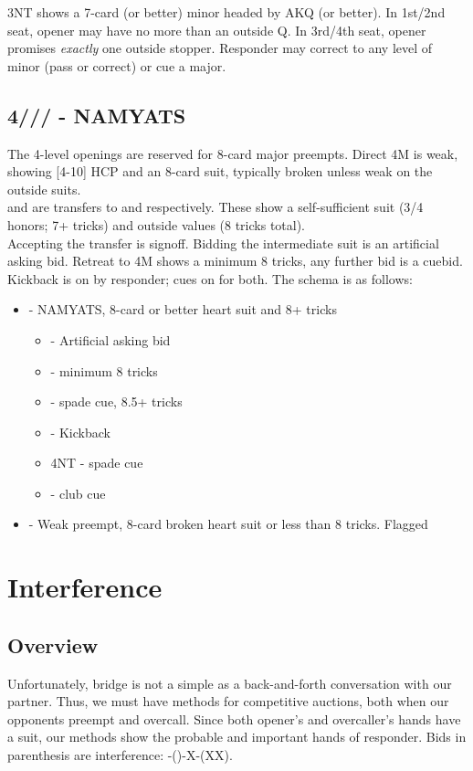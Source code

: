 \documentclass[12pt]{report}
\newcommand{\n}{\\}
\newcommand{\q}[1]{\multido{}{#1}{\qquad}}
\newcommand{\ul}[1]{\begin{itemize}#1\end{itemize}}
\newcommand{\li}[1]{\item[~] \q{#1}}
\newcommand{\bidsection}[2]{\section{\texorpdfstring{#1}{#2}}}
\begin{document}
    3NT shows a 7-card (or better) minor headed by AKQ (or better).  In 1st/2nd seat, opener may have no more than an outside Q.  In 3rd/4th seat, opener promises \textit{exactly} one outside stopper. Responder may correct to any level of minor (pass or correct) or cue a major.

\bidsection{4\cl{}/\di{}/\he{}/\sp{} - NAMYATS}{4♣/♢/♡/♠ - NAMYATS} \label{2:13}

    The 4-level openings are reserved for 8-card major preempts.  Direct 4M is weak, showing [4-10] HCP and an 8-card suit, typically broken unless weak on the outside suits.\n

     and  are transfers to  and  respectively.  These show a self-sufficient suit (3/4 honors; 7+ tricks) and outside values (8 tricks total).\n

    Accepting the transfer is signoff.  Bidding the intermediate suit is an artificial asking bid.  Retreat to 4M shows a minimum 8 tricks, any further bid is a cuebid.\n

    Kickback is on by responder; cues on for both.  The schema is as follows:

    \ul{
        \li0  - NAMYATS, 8-card or better heart suit and 8+ tricks \ul{
            \li0 \di4 - Artificial asking bid
                \li1 \he4 - minimum 8 tricks
                \li1 \sp4 - spade cue, 8.5+ tricks
            \li0 \sp4 - Kickback
            \li0 4NT - spade cue
            \li0 \cl5 - club cue
        }

        \li0 \he4 - Weak preempt, 8-card broken heart suit or less than 8 tricks.  Flagged
    }

\chapter{Interference}  \label{3}
\section{Overview} \label{3:1}

Unfortunately, bridge is not a simple as a back-and-forth conversation with our partner.  Thus, we must have methods for competitive auctions, both when our opponents preempt and overcall.  Since both opener's and overcaller's hands have a suit, our methods show the probable and important hands of responder.  Bids in parenthesis are interference: -()-X-(XX). \n
\end{document}
